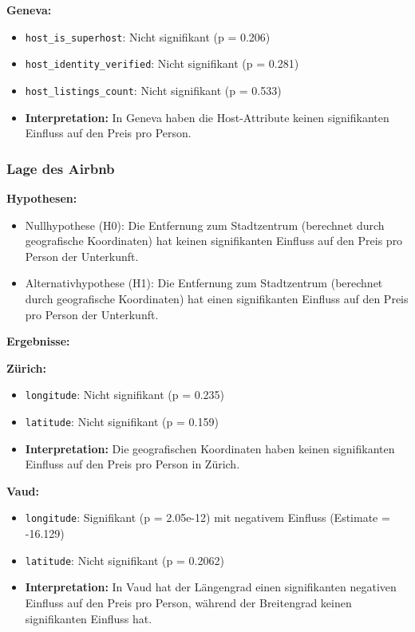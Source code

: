 \documentclass[
  journal,
]{IEEEtran}%
\providecommand{\tightlist}{%
  \setlength{\itemsep}{0pt}\setlength{\parskip}{0pt}}\usepackage{longtable,booktabs,array}
\begin{document}
\textbf{Geneva:}

\begin{itemize}
\item
  \texttt{host\_is\_superhost}: Nicht signifikant (p = 0.206)
\item
  \texttt{host\_identity\_verified}: Nicht signifikant (p = 0.281)
\item
  \texttt{host\_listings\_count}: Nicht signifikant (p = 0.533)
\item
  \textbf{Interpretation:} In Geneva haben die Host-Attribute keinen
  signifikanten Einfluss auf den Preis pro Person.
\end{itemize}

\subsubsection{Lage des Airbnb}\label{lage-des-airbnb}

\textbf{Hypothesen:}

\begin{itemize}
\tightlist
\item
  Nullhypothese (H0): Die Entfernung zum Stadtzentrum (berechnet durch
  geografische Koordinaten) hat keinen signifikanten Einfluss auf den
  Preis pro Person der Unterkunft.
\item
  Alternativhypothese (H1): Die Entfernung zum Stadtzentrum (berechnet
  durch geografische Koordinaten) hat einen signifikanten Einfluss auf
  den Preis pro Person der Unterkunft.
\end{itemize}

\textbf{Ergebnisse:}

\textbf{Zürich:}

\begin{itemize}
\item
  \texttt{longitude}: Nicht signifikant (p = 0.235)
\item
  \texttt{latitude}: Nicht signifikant (p = 0.159)
\item
  \textbf{Interpretation:} Die geografischen Koordinaten haben keinen
  signifikanten Einfluss auf den Preis pro Person in Zürich.
\end{itemize}

\textbf{Vaud:}

\begin{itemize}
\item
  \texttt{longitude}: Signifikant (p = 2.05e-12) mit negativem Einfluss
  (Estimate = -16.129)
\item
  \texttt{latitude}: Nicht signifikant (p = 0.2062)
\item
  \textbf{Interpretation:} In Vaud hat der Längengrad einen
  signifikanten negativen Einfluss auf den Preis pro Person, während der
  Breitengrad keinen signifikanten Einfluss hat.
\end{itemize}
\end{document}
